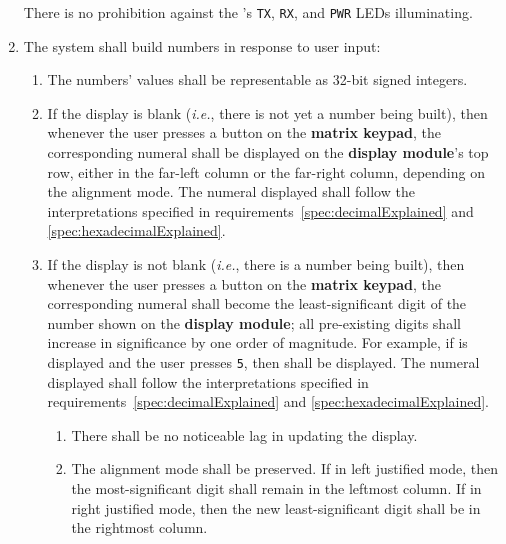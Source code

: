 \begin{enumerate}
        There is no prohibition against the \developmentboard's \texttt{TX}, \texttt{RX}, and \texttt{PWR} LEDs illuminating.
    \item The system shall build numbers in response to user input:
        \begin{enumerate}
        \item \label{spec:32bits} The numbers' values shall be representable as 32-bit signed integers.
        \item \label{spec:initialKeyPress} If the display is blank (\textit{i.e.}, there is not yet a number being built), then whenever the user presses a button on the \textbf{matrix keypad}, the corresponding numeral shall be displayed on the \textbf{display module}'s top row, either in the far-left column or the far-right column, depending on the alignment mode.
            The numeral displayed shall follow the interpretations specified in requirements~\ref{spec:decimalExplained} and \ref{spec:hexadecimalExplained}.
        \item \label{spec:BuildingValue} If the display is not blank (\textit{i.e.}, there is a number being built), then whenever the user presses a button on the \textbf{matrix keypad}, the corresponding numeral shall become the least-significant digit of the number shown on the \textbf{display module};
            all pre-existing digits shall increase in significance by one order of magnitude.
            For example, if  is displayed and the user presses \texttt{5}, then  shall be displayed.
            The numeral displayed shall follow the interpretations specified in requirements~\ref{spec:decimalExplained} and \ref{spec:hexadecimalExplained}.
            \begin{enumerate}
                \item There shall be no noticeable lag in updating the display.
                \item The alignment mode shall be preserved.
                    If in left justified mode, then the most-significant digit shall remain in the leftmost column.
                    If in right justified mode, then the new least-significant digit shall be in the rightmost column.

\end{enumerate}
\end{enumerate}
\end{enumerate}
